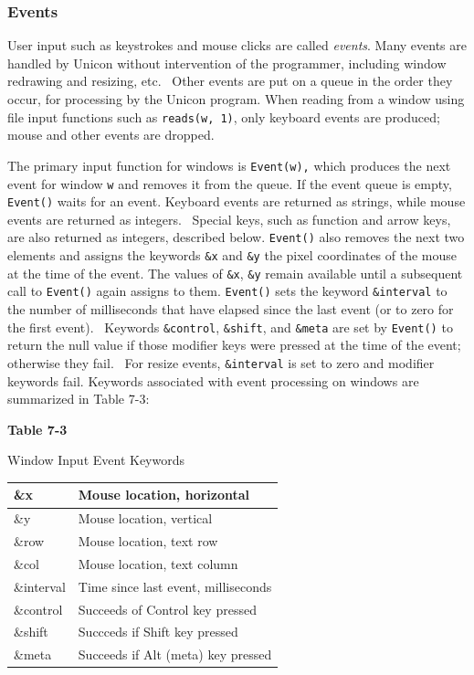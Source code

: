 \subsubsection{Events}

User input such as keystrokes and mouse clicks are called
\textit{events}. Many events are handled by Unicon without intervention
of the programmer, including window redrawing and resizing, etc.
\ Other events are put on a queue in the order they occur, for
processing by the Unicon program. When reading from a window using file
input functions such as \texttt{reads(w, 1)}, only keyboard events are
produced; mouse and other events are dropped.

The primary input function for windows is \texttt{Event(w),} which
produces the next event for window \texttt{w} and removes it from the
queue. If the event queue is empty, \texttt{Event()} waits for an
event. Keyboard events are returned as strings, while mouse events are
returned as integers. \ Special keys, such as function and arrow keys,
are also returned as integers, described below. \texttt{Event()} also
removes the next two elements and assigns the keywords \texttt{\&x} and
\texttt{\&y} the pixel coordinates of the mouse at the time of the
event. The values of \texttt{\&x}, \texttt{\&y} remain available until
a subsequent call to \texttt{Event()} again assigns to them.
\texttt{Event()} sets the keyword \texttt{\&interval} to the number of
milliseconds that have elapsed since the last event (or to zero for the
first event). \ Keywords \texttt{\&control}, \texttt{\&shift}, and
\texttt{\&meta} are set by \texttt{Event()} to return the null value if
those modifier keys were pressed at the time of the event; otherwise
they fail. \ For resize events, \texttt{\&interval} is set to zero and
modifier keywords fail. Keywords associated with event processing on
windows are summarized in Table 7-3:

{\centering\sffamily\bfseries
Table 7-3

Window Input Event Keywords
}

\begin{center}
\begin{supertabular}{|m{0.91775984in}|m{2.3525598in}|}
\sffamily \&x &
Mouse location, horizontal\\\hline
\sffamily \&y &
Mouse location, vertical\\\hline
\sffamily \&row &
Mouse location, text row\\\hline
\sffamily \&col &
Mouse location, text column\\\hline
\sffamily \&interval &
Time since last event, milliseconds\\\hline
\sffamily \&control &
Succeeds of Control key pressed\\\hline
\sffamily \&shift &
Succceds if Shift key pressed\\\hline
\sffamily \&meta &
Succeeds if Alt (meta) key pressed\\\hline
\end{supertabular}
\end{center}
